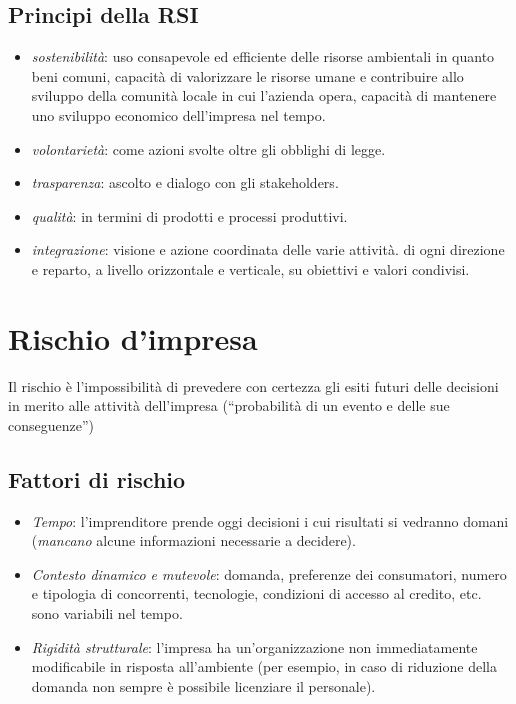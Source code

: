 \subsection{Principi della RSI}
\begin{itemize}
    \item \emph{sostenibilità}: uso consapevole ed efficiente delle risorse
    ambientali in quanto beni comuni, capacità di valorizzare le risorse umane
    e contribuire allo sviluppo della comunità locale in cui l’azienda opera,
    capacità di mantenere uno sviluppo economico dell’impresa nel tempo.
    \item \emph{volontarietà}: come azioni svolte oltre gli obblighi di legge.
    \item \emph{trasparenza}: ascolto e dialogo con gli \glspl{stakeholder}.
    \item \emph{qualità}: in termini di prodotti e processi produttivi.
    \item \emph{integrazione}: visione e azione coordinata delle varie attività.
    di ogni direzione e reparto, a livello orizzontale e verticale, su obiettivi
    e valori condivisi.
\end{itemize}

\section{Rischio d'impresa}
Il \gls{rischio} è l'impossibilità di prevedere con certezza gli esiti futuri delle decisioni
in merito alle attività dell’impresa (``probabilità di un evento e delle sue
conseguenze'')

\subsection{Fattori di rischio}
\begin{itemize}
    \item \emph{Tempo}: l'imprenditore prende oggi decisioni i cui risultati si
    vedranno domani (\emph{mancano} alcune informazioni necessarie a decidere).
    \item \emph{Contesto dinamico e mutevole}: domanda, preferenze dei
    consumatori, numero e tipologia di concorrenti, tecnologie, condizioni di
    accesso al credito, etc. sono variabili nel tempo.
    \item \emph{Rigidità strutturale}: l’impresa ha un’organizzazione non
    immediatamente modificabile in risposta all’ambiente (per esempio, in caso
    di riduzione della domanda non sempre è possibile licenziare il personale).
\end{itemize}

